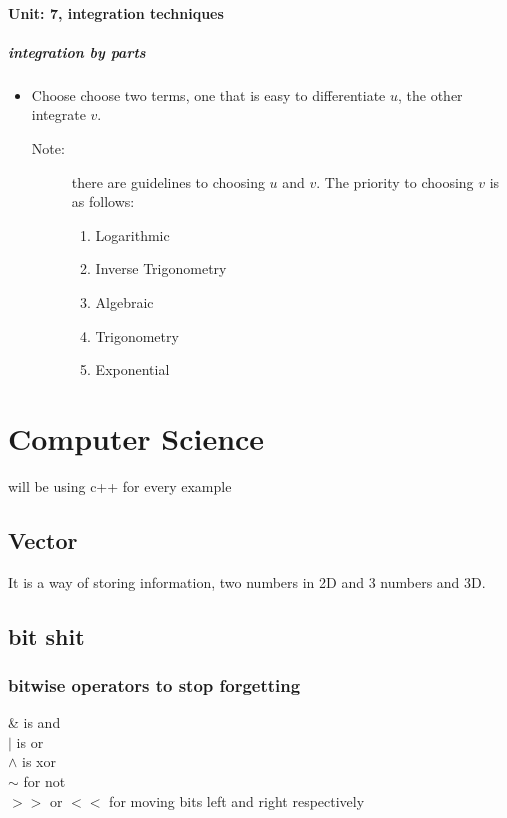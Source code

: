 \documentclass{article} %
\theoremstyle{theorem}
\theoremstyle{definition}
\begin{document}
            \paragraph{Unit: 7, integration techniques}
            \label{par:Unit-7}%
                \subparagraph{integration by parts}
                \begin{itemize}
                    \item Choose choose two terms, one that is easy to differentiate $u$, the other integrate $v$.
                    \begin{description}
                        \item[Note:] there are guidelines to choosing $u$ and $v$. The priority to choosing $v$ is as follows:
                        \begin{enumerate}
                            \item Logarithmic
                            \item Inverse Trigonometry
                            \item Algebraic
                            \item Trigonometry
                            \item Exponential
                        \end{enumerate}
                    \end{description}
                    
                \end{itemize}
\pagebreak
\section{Computer Science}\label{sec:csSec}
will be using c++ for every example
    \subsection{Vector}\label{sub:csVec}
    It is a way of storing information, two numbers in 2D and 3 numbers and 3D.
    \subsection{bit shit}
        \subsubsection{bitwise operators to stop forgetting}
            \begin{center}
                \& is and\\$|$ is or\\$\wedge$ is xor\\$\sim$ for not\\$>>$ or $<<$ for moving bits left and right respectively
            \end{center}
\end{document}
